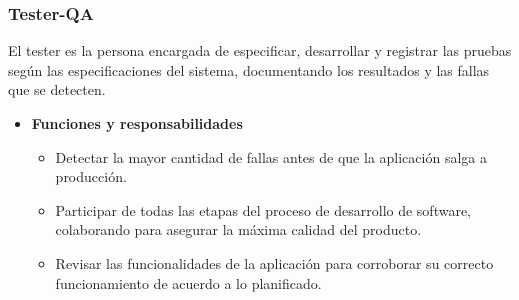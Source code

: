     	\subsubsection{Tester-QA}            	  
        El tester es la persona encargada de especificar, desarrollar y registrar las pruebas según las especificaciones del sistema, documentando los resultados y las fallas que se detecten.
			\begin{itemize}
			    \item \textbf{Funciones y responsabilidades}
            	
                \begin{itemize}
				    \item Detectar la mayor cantidad de fallas antes de que la aplicación salga a producción.
                    \item Participar de todas las etapas del proceso de desarrollo de software, colaborando para asegurar la máxima calidad del producto.
                    \item Revisar las funcionalidades de la aplicación para corroborar su correcto funcionamiento de acuerdo a lo planificado.
				\end{itemize}
            

\end{itemize}
